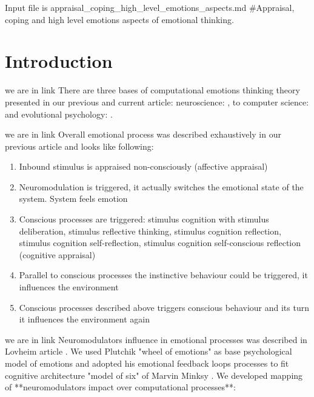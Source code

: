 Input file is  appraisal_coping_high_level_emotions_aspects.md
#Appraisal, coping and high level emotions aspects of emotional thinking.

\section{Introduction}

we are in link
There are three bases of computational emotions thinking theory presented in our previous\cite{computational_emotional_thinking} and current article: neuroscience: \cite{emotionsbraintorobot, parsingreward, neuromodulatory, cubeofemotions, natureofemotions}, to computer science: \cite{emotionandsociable, senticcomputing, hourglass, affectivemodelofinterplay, affectivecomputing, computationalmodelsemotion, computationalmodelsemotionscognition, evaluatingcomutationalmodel, threelevel} and evolutional psychology: \cite{natureofemotions, primer_affect_psychology, tomkins1, tomkins2, tomkins3, tomkins4}.

we are in link
Overall emotional process was described exhaustively in our previous article \cite{computational_emotional_thinking} and looks like following:

\begin{enumerate}
\item  Inbound stimulus is appraised non-consciously (affective appraisal)
\item  Neuromodulation is triggered, it actually switches the emotional state of the system. System feels emotion
\item  Conscious processes are triggered: stimulus cognition with stimulus deliberation, stimulus reflective thinking, stimulus cognition reflection, stimulus cognition self-reflection, stimulus cognition self-conscious reflection (cognitive appraisal)
\item  Parallel to conscious processes the instinctive behaviour could be triggered, it influences the environment
\item  Conscious processes described above triggers conscious behaviour and its turn it influences the environment again
\end{enumerate}

we are in link
Neuromodulators influence in emotional processes was described in Lovheim article \cite{cubeofemotions}. We used Plutchik "wheel of emotions" as base psychological model of emotions \cite{natureofemotions} and adopted his emotional feedback loops processes to fit cognitive architecture "model of six" of Marvin Minksy \cite{emotionmachine}. We developed mapping of **neuromodulators impact over computational processes**:

